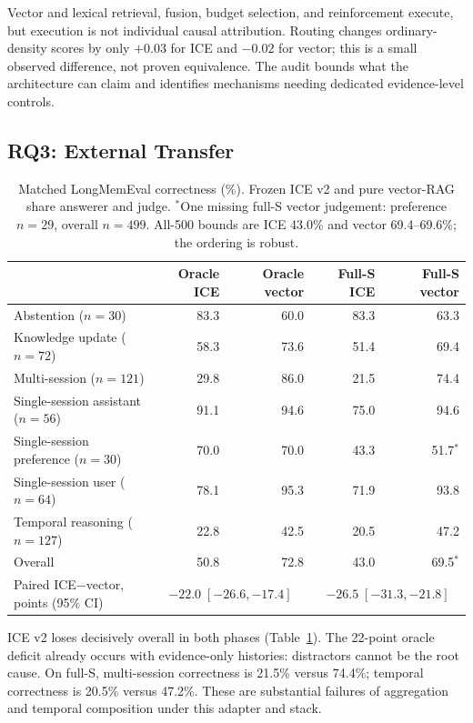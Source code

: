 \documentclass[11pt]{article}
\begin{document}
Vector and lexical retrieval, fusion, budget selection, and reinforcement execute, but execution is not individual causal attribution. Routing changes ordinary-density scores by only $+0.03$ for ICE and $-0.02$ for vector; this is a small observed difference, not proven equivalence. The audit bounds what the architecture can claim and identifies mechanisms needing dedicated evidence-level controls.

\subsection{RQ3: External Transfer}
\begin{table}[t]
\centering\small
\begin{tabular}{@{}lrrrr@{}}\toprule
 & Oracle ICE & Oracle vector & Full-S ICE & Full-S vector\\\midrule
Abstention ($n=30$) & 83.3 & 60.0 & 83.3 & 63.3\\
Knowledge update ($n=72$) & 58.3 & 73.6 & 51.4 & 69.4\\
Multi-session ($n=121$) & 29.8 & 86.0 & 21.5 & 74.4\\
Single-session assistant ($n=56$) & 91.1 & 94.6 & 75.0 & 94.6\\
Single-session preference ($n=30$) & 70.0 & 70.0 & 43.3 & 51.7$^*$\\
Single-session user ($n=64$) & 78.1 & 95.3 & 71.9 & 93.8\\
Temporal reasoning ($n=127$) & 22.8 & 42.5 & 20.5 & 47.2\\\midrule
Overall & 50.8 & 72.8 & 43.0 & 69.5$^*$\\
Paired ICE$-$vector, points (95\% CI) & \multicolumn{2}{c}{$-22.0\;[-26.6,-17.4]$} & \multicolumn{2}{c}{$-26.5\;[-31.3,-21.8]$}\\\bottomrule
\end{tabular}
\caption{Matched LongMemEval correctness (\%). Frozen ICE v2 and pure vector-RAG share answerer and judge. $^*$One missing full-S vector judgement: preference $n=29$, overall $n=499$. All-500 bounds are ICE 43.0\% and vector 69.4--69.6\%; the ordering is robust.}
\label{tab:lme}
\end{table}
ICE v2 loses decisively overall in both phases (Table~\ref{tab:lme}). The 22-point oracle deficit already occurs with evidence-only histories: distractors cannot be the root cause. On full-S, multi-session correctness is 21.5\% versus 74.4\%; temporal correctness is 20.5\% versus 47.2\%. These are substantial failures of aggregation and temporal composition under this adapter and stack.
\end{document}
